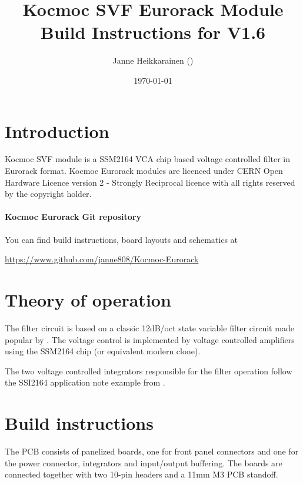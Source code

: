 \documentclass{article}
\title{Kocmoc SVF Eurorack Module Build Instructions for V1.6}
\author{Janne Heikkarainen (\email{janne808@radiofreerobotron.net}) \\
	}
\date{\today}
\begin{document}
\maketitle

\section{Introduction}
Kocmoc SVF module is a SSM2164 VCA chip based voltage controlled filter in Eurorack format. Kocmoc Eurorack modules are licenced under CERN Open Hardware Licence version 2 - Strongly Reciprocal licence with all rights reserved by the copyright holder. \newline

\paragraph{Kocmoc Eurorack Git repository}
\begin{flushleft}
You can find build instructions, board layouts and schematics at \newline
\end{flushleft}
\begin{center}
\href{https://www.github.com/janne808/Kocmoc-Eurorack}{https://www.github.com/janne808/Kocmoc-Eurorack}
\end{center}

\section{Theory of operation} \label{theoryofoperation}

The filter circuit is based on a classic 12dB/oct state variable filter circuit made popular by \cite{chamberlin}. The voltage control is implemented by voltage controlled amplifiers using the SSM2164 chip (or equivalent modern clone).\newline

The two voltage controlled integrators responsible for the filter operation follow the SSI2164 application note example from \cite{allaert}.

\section{Build instructions} \label{buildinstructions}

\begin{flushleft}
The PCB consists of panelized boards, one for front panel connectors and one for the power connector, integrators and input/output buffering. The boards are connected together with two 10-pin headers and a 11mm M3 PCB standoff.\newline
\end{flushleft}
\end{document}
